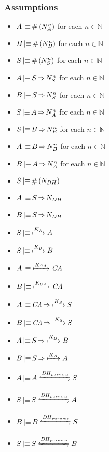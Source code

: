 \subsubsection{Assumptions}

\begin{itemize}
	\item \(A \operatorname{\mid\equiv} \#\left(N_A^n\right)\) for each \(n \in \mathbb{N}\)
	\item \(B \operatorname{\mid\equiv} \#\left(N_B^n\right)\) for each \(n \in \mathbb{N}\)
	\item \(S \operatorname{\mid\equiv} \#\left(N_S^n\right)\) for each \(n \in \mathbb{N}\)
	\item \(A \operatorname{\mid\equiv} S \operatorname{\Rightarrow} N_S^n\) for each \(n \in \mathbb{N}\)
	\item \(B \operatorname{\mid\equiv} S \operatorname{\Rightarrow} N_S^n\) for each \(n \in \mathbb{N}\)
	\item \(S \operatorname{\mid\equiv} A \operatorname{\Rightarrow} N_A^n\) for each \(n \in \mathbb{N}\)
	\item \(S \operatorname{\mid\equiv} B \operatorname{\Rightarrow} N_B^n\) for each \(n \in \mathbb{N}\)
	\item \(A \operatorname{\mid\equiv} B \operatorname{\Rightarrow} N_B^n\) for each \(n \in \mathbb{N}\)
	\item \(B \operatorname{\mid\equiv} A \operatorname{\Rightarrow} N_A^n\) for each \(n \in \mathbb{N}\)
	\item \(S \operatorname{\mid\equiv} \#\left(N_{DH}\right)\)
	\item \(A \operatorname{\mid\equiv} S \operatorname{\Rightarrow} N_{DH}\)
	\item \(B \operatorname{\mid\equiv} S \operatorname{\Rightarrow} N_{DH}\)
	\item \(S \operatorname{\mid\equiv} \xmapsto{K_A} A\)
	\item \(S \operatorname{\mid\equiv} \xmapsto{K_B} B\)
	\item \(A \operatorname{\mid\equiv} \xmapsto{K_{CA}} \mathit{CA}\)
	\item \(B \operatorname{\mid\equiv} \xmapsto{K_{CA}} \mathit{CA}\)
	\item \(A \operatorname{\mid\equiv} \mathit{CA} \operatorname{\Rightarrow} \xmapsto{K_S} S\)
	\item \(B \operatorname{\mid\equiv} \mathit{CA} \operatorname{\Rightarrow} \xmapsto{K_S} S\)
	\item \(A \operatorname{\mid\equiv} S \operatorname{\Rightarrow} \xmapsto{K_B} B\)
	\item \(B \operatorname{\mid\equiv} S \operatorname{\Rightarrow} \xmapsto{K_A} A\)
	\item \(A \believes A \secret{\mathit{DH}_{params}} S\)
	\item \(S \believes S \secret{\mathit{DH}_{params}} A\)
	\item \(B \believes B \secret{\mathit{DH}_{params}} S\)
	\item \(S \believes S \secret{\mathit{DH}_{params}} B\)

\end{itemize}
